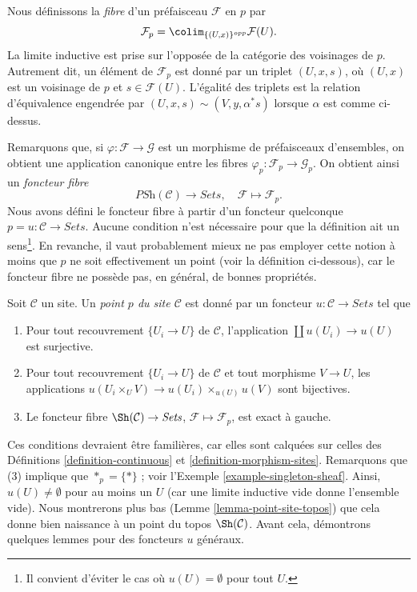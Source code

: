 \medskip\noindent
Nous définissons la {\it fibre} d’un préfaisceau $\mathcal{F}$ en $p$ par
\begin{equation}
\label{equation-stalk}
\mathcal{F}_p = \colim_{\{(U, x)\}^{opp}} \mathcal{F}(U).
\end{equation}
La limite inductive est prise sur l’opposée de la catégorie des
voisinages de $p$. Autrement dit, un élément de $\mathcal{F}_p$ est donné par
un triplet $(U, x, s)$, où $(U, x)$ est un voisinage de $p$ et
$s \in \mathcal{F}(U)$. L’égalité des triplets est la relation d’équivalence
engendrée par $(U, x, s) \sim (V, y, \alpha^*s)$ lorsque $\alpha$ est comme
ci-dessus.

\medskip\noindent
Remarquons que, si $\varphi : \mathcal{F} \to \mathcal{G}$ est un morphisme
de préfaisceaux d’ensembles, on obtient une application canonique entre les
fibres $\varphi_p : \mathcal{F}_p \to \mathcal{G}_p$. On obtient ainsi un
{\it foncteur fibre}
$$
\textit{PSh}(\mathcal{C}) \longrightarrow \textit{Sets}, \quad
\mathcal{F} \longmapsto \mathcal{F}_p.
$$
Nous avons défini le foncteur fibre à partir d’un foncteur quelconque
$p = u : \mathcal{C} \to \textit{Sets}$. Aucune condition n’est nécessaire
pour que la définition ait un sens\footnote{Il convient d’éviter le cas où
$u(U) = \emptyset$ pour tout $U$.}. En revanche, il vaut probablement mieux
ne pas employer cette notion à moins que $p$ ne soit effectivement un point
(voir la définition ci-dessous), car le foncteur fibre ne possède pas, en
général, de bonnes propriétés.

\begin{definition}
\label{definition-point}
Soit $\mathcal{C}$ un site. Un {\it point $p$ du site $\mathcal{C}$} est donné
par un foncteur $u : \mathcal{C} \to \textit{Sets}$ tel que
\begin{enumerate}
\item Pour tout recouvrement $\{U_i \to U\}$ de $\mathcal{C}$, l’application
$\coprod u(U_i) \to u(U)$ est surjective.
\item Pour tout recouvrement $\{U_i \to U\}$ de $\mathcal{C}$ et tout
morphisme $V \to U$, les applications
$u(U_i \times_U V) \to u(U_i) \times_{u(U)} u(V)$ sont bijectives.
\item Le foncteur fibre $\Sh(\mathcal{C}) \to \textit{Sets}$,
$\mathcal{F} \mapsto \mathcal{F}_p$, est exact à gauche.
\end{enumerate}
\end{definition}

\noindent
Ces conditions devraient être familières, car elles sont calquées sur celles
des Définitions \ref{definition-continuous} et
\ref{definition-morphism-sites}.
Remarquons que (3) implique que $*_p = \{*\}$ ; voir
l’Exemple \ref{example-singleton-sheaf}. Ainsi,
$u(U) \not = \emptyset$ pour au moins un $U$ (car une limite inductive vide
donne l’ensemble vide). Nous montrerons plus bas
(Lemme \ref{lemma-point-site-topos}) que cela donne bien naissance à un point
du topos $\Sh(\mathcal{C})$.
Avant cela, démontrons quelques lemmes pour des foncteurs $u$ généraux.

